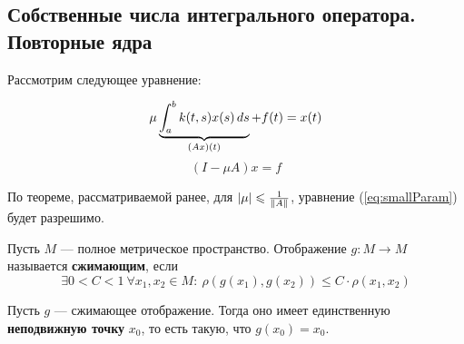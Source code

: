 \documentclass[12pt]{article}
\begin{document}
	\subsection{Собственные числа интегрального оператора. Повторные ядра}
	
		Рассмотрим следующее уравнение:
	
		\begin{equation*}	
			\mu \underbrace{\int_a^b k(t,s) x(s)\,ds}_{(Ax)(t)} + f(t) = x(t) \\		
		\end{equation*}
		\begin{equation}
			(I - \mu A)x = f \label{eq:smallParam}
		\end{equation}
	
		По теореме, рассматриваемой ранее, для $\left| \mu \right| \leqslant \frac{1}{\left\| A \right\|}$, 
		уравнение (\ref{eq:smallParam}) будет разрешимо.
	
		\begin{defi}
			Пусть $M$ --- полное метрическое пространство. Отображение $g: M\rightarrow M$ называется \textbf{сжимающим}, если
			$$\exists 0 < C < 1 \: \forall x_1,x_2 \in M\!\!:\: \rho(g(x_1), g(x_2)) \leq C\cdot\rho(x_1,x_2)$$
		\end{defi}
	
		\begin{theorem} \label{th:CompFunc}
			Пусть $g$ --- сжимающее отображение. Тогда оно имеет единственную \textbf{неподвижную точку} $x_0$, 
			то есть такую, что $g(x_0) = x_0$.
		\end{theorem}
	
\end{document}
